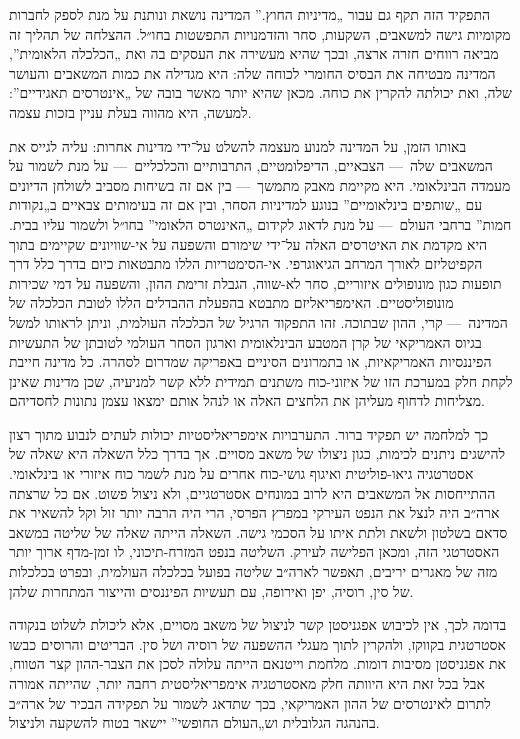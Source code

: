 התפקיד הזה תקף גם עבור „מדיניות החוץ.” המדינה נושאת ונותנת על מנת לספק לחברות מקומיות גישה למשאבים, השקעות, סחר והזדמנויות התפשטות בחו״ל. ההצלחה של תהליך זה מביאה רווחים חזרה ארצה, ובכך שהיא מעשירה את העסקים בה ואת „הכלכלה הלאומית”, המדינה מבטיחה את הבסיס החומרי לכוחה שלה: היא מגדילה את כמות המשאבים והעושר שלה, ואת יכולתה להקרין את כוחה. מכאן שהיא יותר מאשר בובה של „אינטרסים תאגידיים”: למעשה, היא מהווה בעלת עניין בזכות עצמה.

באותו הזמן, על המדינה למנוע מעצמה להשלט על־ידי מדינות אחרות: עליה לגייס את המשאבים שלה~— הצבאיים, הדיפלומטיים, התרבותיים והכלכליים~— על מנת לשמור על מעמדה הבינלאומי. היא מקיימת מאבק מתמשך~— בין אם זה בשיחות מסביב לשולחן הדיונים עם „שותפים בינלאומיים” בנוגע למדיניות הסחר, ובין אם זה בעימותים צבאיים ב„נקודות חמות” ברחבי העולם~— על מנת לדאוג לקידום „האינטרס הלאומי” בחו״ל ולשמור עליו בבית. היא מקדמת את האיטרסים האלה על־ידי שימורם והשפעה על אי-שוויונים שקיימים בתוך הקפיטליזם לאורך המרחב הגיאוגרפי. אי-הסימטריות הללו מתבטאות כיום בדרך כלל דרך תופעות כגון מונופולים איזוריים, סחר לא-שווה, הגבלת זרימת ההון, והשפעה על דמי שכירות מונופוליסטיים. האימפריאליזם מתבטא בהפעלת ההבדלים הללו לטובת הכלכלה של המדינה~— קרי, ההון שבתוכה. זהו התפקוד הרגיל של הכלכלה העולמית, וניתן לראותו למשל בגיוס האמריקאי של קרן המטבע הבינלאומית וארגון הסחר העולמי לטובתן של התעשיות הפיננסיות האמריקאיות, או בתמרונים הסיניים באפריקה שמדרום לסהרה. כל מדינה חייבת לקחת חלק במערכת הזו של איזוני-כוח משתנים תמידית ללא  קשר למניעיה, שכן מדינות שאינן מצליחות לדחוף מעליהן את הלחצים האלה או לנהל אותם ימצאו עצמן נתונות לחסדיהם.

כך למלחמה יש תפקיד ברור. התערבויות אימפריאליסטיות יכולות לעתים לנבוע מתוך רצון להישגים ניתנים לכימות, כגון ניצולו של משאב מסויים. אך בדרך כלל השאלה היא שאלה של אסטרטגיה גיאו-פוליטית ואיגוף גושי-כוח אחרים על מנת לשמר כוח איזורי או בינלאומי. ההתייחסות אל המשאבים היא לרוב במונחים אסטרטגיים, ולא ניצול פשוט. אם כל שרצתה ארה״ב היה לנצל את הנפט העירקי במפרץ הפרסי, הרי היה הרבה יותר זול וקל להשאיר את סדאם בשלטון ולשאת ולתת איתו על הסכמי גישה. השאלה הייתה שאלה של שליטה במשאב האסטרטגי הזה, ומכאן הפלישה לעירק. השליטה בנפט המזרח-תיכוני, לו זמן-מדף ארוך יותר מזה של מאגרים יריבים, תאפשר לארה״ב שליטה בפועל בכלכלה העולמית, ובפרט בכלכלות של סין, רוסיה, יפן ואירופה, עם תעשיות הפיננסים והייצור המתחרות שלהן.

בדומה לכך, אין לכיבוש אפגניסטן קשר לניצול של משאב מסויים, אלא ליכולת לשלוט בנקודה אסטרטגית בקווקז, ולהקרין לתוך מעגלי ההשפעה של רוסיה ושל סין. הבריטים והרוסים כבשו את אפגניסטן מסיבות דומות. מלחמת וייטנאם הייתה עלולה לסכן את הצבר-ההון קצר הטווח, אבל בכל זאת היא היוותה חלק מאסטרטגיה אימפריאליסטית רחבה יותר, שהייתה אמורה לתרום לאינטרסים של ההון האמריקאי, בכך שתדאג לשמור על תפקידה הבכיר של ארה״ב בהנהגה הגלובלית וש„העולם החופשי” יישאר בטוח להשקעה ולניצול.

